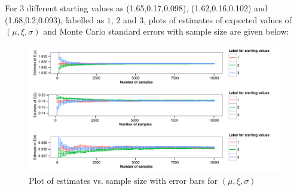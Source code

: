 \documentclass[12pt]{article}
\begin{document}
\begin{enumerate}[label=(\alph*)]
\begin{enumerate}[label=(\roman*)]
For 3 different starting values as (1.65,0.17,0.098), (1.62,0.16,0.102) and (1.68,0.2,0.093), labelled as $1$, $2$ and $3$, plots of estimates of expected values of $(\mu,\xi,\sigma)$ and Monte Carlo standard errors with sample size are given below:
\begin{figure}[H]
\begin{centering}
\includegraphics{aua257HW3-011}
\caption{Plot of estimates vs. sample size with error bars for $(\mu,\xi,\sigma)$}
\end{centering}
\end{figure}


\end{enumerate}
\end{enumerate}
\end{document}
